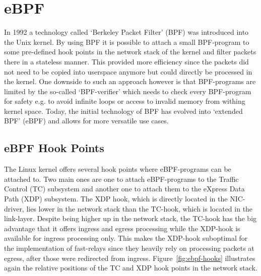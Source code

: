 \section{eBPF}\label{sec:ebpf_bg}
In 1992 a technology called `Berkeley Packet Filter' (BPF) was introduced into 
the Unix kernel.
By using BPF it is possible to attach a small BPF-program to some pre-defined hook points in 
the network stack of the kernel and filter packets there in a stateless manner.
This provided more efficiency since the packets did not need to be copied into 
userspace anymore but could directly be processed in the kernel.
One downside to such an approach however is that BPF-programs are limited by the 
so-called `BPF-verifier' which needs to check every BPF-program for safety e.g. 
to avoid infinite loops or access to invalid memory from withing kernel space. 
Today, the initial technology of BPF has evolved into `extended BPF' (eBPF) and 
allows for more versatile use cases.

\subsection{eBPF Hook Points}
The Linux kernel offers several hook points where eBPF-programs can be attached to.
Two main ones are one to attach eBPF-programs to the Traffic Control (TC) subsystem
and another one to attach them to the eXpress Data Path (XDP) subsystem.
The XDP hook, which is directly located in the NIC-driver, lies lower in the network 
stack than the TC-hook, which is located in the link-layer.
Despite being higher up in the network stack, the TC-hook has the big advantage that
it offers ingress and egress processing while the XDP-hook is available for ingress 
processing only.
This makes the XDP-hook suboptimal for the implementation of fast-relays since 
they heavily rely on processing packets at egress, after those were redirected
from ingress.
Figure~\ref{fig:ebpf-hooks} illustrates again the relative positions of the TC and
XDP hook points in the network stack.

